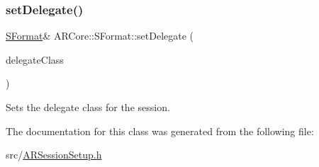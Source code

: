 \mbox{\label{class_a_r_core_1_1_s_format_a944fac3b51c5193dcb306bd482f4f1f1}} 
\subsubsection{\texorpdfstring{set\+Delegate()}{setDelegate()}}
{\footnotesize\ttfamily \hyperlink{class_a_r_core_1_1_s_format}{S\+Format}\& A\+R\+Core\+::\+S\+Format\+::set\+Delegate (\begin{DoxyParamCaption}\item[{N\+S\+Object$<$ A\+R\+Session\+Delegate $>$ $\ast$}]{delegate\+Class }\end{DoxyParamCaption})\hspace{0.3cm}{\ttfamily [inline]}}



Sets the delegate class for the session. 



The documentation for this class was generated from the following file\+:\begin{DoxyCompactItemize}
\item 
src/\hyperlink{_a_r_session_setup_8h}{A\+R\+Session\+Setup.\+h}\end{DoxyCompactItemize}
